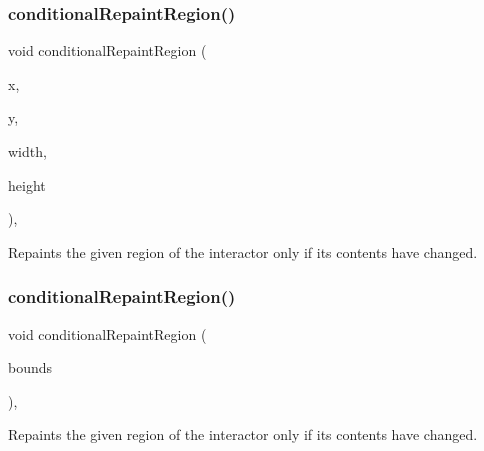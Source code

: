 \subsubsection{\texorpdfstring{conditional\+Repaint\+Region()}{conditionalRepaintRegion()}\hspace{0.1cm}{\footnotesize\ttfamily [1/2]}}
{\footnotesize\ttfamily void conditional\+Repaint\+Region (\begin{DoxyParamCaption}\item[{int}]{x,  }\item[{int}]{y,  }\item[{int}]{width,  }\item[{int}]{height }\end{DoxyParamCaption})\hspace{0.3cm}{\ttfamily [virtual]}, {\ttfamily [inherited]}}



Repaints the given region of the interactor only if its contents have changed. 

\mbox{\label{classsgl_1_1GDrawingSurface_a3932a12278752db368e24fa404e446aa}} 
\subsubsection{\texorpdfstring{conditional\+Repaint\+Region()}{conditionalRepaintRegion()}\hspace{0.1cm}{\footnotesize\ttfamily [2/2]}}
{\footnotesize\ttfamily void conditional\+Repaint\+Region (\begin{DoxyParamCaption}\item[{const \mbox{\hyperlink{structsgl_1_1GRectangle}{G\+Rectangle}} \&}]{bounds }\end{DoxyParamCaption})\hspace{0.3cm}{\ttfamily [virtual]}, {\ttfamily [inherited]}}



Repaints the given region of the interactor only if its contents have changed. 

\mbox{\label{classsgl_1_1GForwardDrawingSurface_a7f7f6c1798bcedfd52151b458074e8a0}} 
